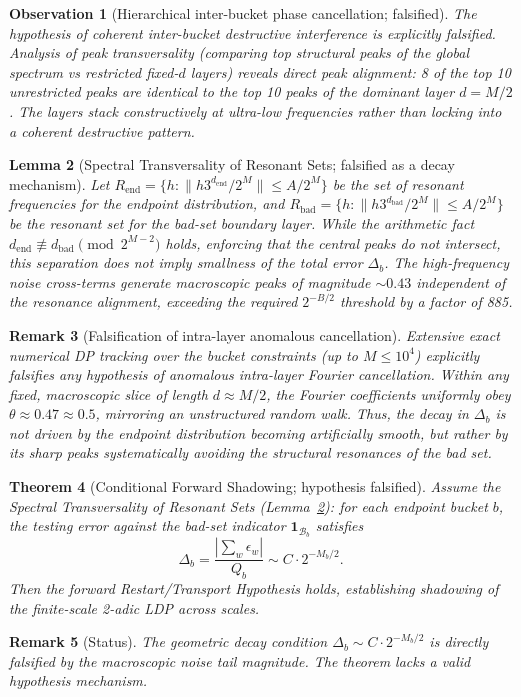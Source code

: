 \documentclass[12pt,a4paper]{article}
\newtheorem{theorem}{Theorem}[section]
\newtheorem{lemma}[theorem]{Lemma}
\newtheorem{remark}[theorem]{Remark}
\newtheorem{observation}[theorem]{Observation}
\begin{document}
\begin{observation}[Hierarchical inter-bucket phase cancellation; falsified]
\label{obs:hierarchical_inter_bucket}
The hypothesis of coherent inter-bucket destructive interference is explicitly falsified. Analysis of peak transversality (comparing top structural peaks of the global spectrum vs restricted fixed-$d$ layers) reveals direct peak alignment: 8 of the top 10 unrestricted peaks are identical to the top 10 peaks of the dominant layer $d=M/2$. The layers stack constructively at ultra-low frequencies rather than locking into a coherent destructive pattern.
\end{observation}

\begin{lemma}[Spectral Transversality of Resonant Sets; falsified as a decay mechanism]
\label{lem:spectral_transversality}
Let $R_{\text{end}} = \{h : \|h 3^{d_{\text{end}}} / 2^M\| \le A/2^M\}$ be the set of resonant frequencies for the endpoint distribution, and $R_{\text{bad}} = \{h : \|h 3^{d_{\text{bad}}} / 2^M\| \le A/2^M\}$ be the resonant set for the bad-set boundary layer. 
While the arithmetic fact $d_{\text{end}} \not\equiv d_{\text{bad}} \pmod{2^{M-2}}$ holds, enforcing that the central peaks do not intersect, this separation does not imply smallness of the total error $\Delta_b$. The high-frequency noise cross-terms generate macroscopic peaks of magnitude $\sim 0.43$ independent of the resonance alignment, exceeding the required $2^{-B/2}$ threshold by a factor of 885.
\end{lemma}

\begin{remark}[Falsification of intra-layer anomalous cancellation]
Extensive exact numerical DP tracking over the bucket constraints (up to $M \le 10^4$) explicitly falsifies any hypothesis of anomalous intra-layer Fourier cancellation. Within any fixed, macroscopic slice of length $d \approx M/2$, the Fourier coefficients uniformly obey $\theta \approx 0.47 \approx 0.5$, mirroring an unstructured random walk. Thus, the decay in $\Delta_b$ is not driven by the endpoint distribution becoming artificially smooth, but rather by its sharp peaks systematically avoiding the structural resonances of the bad set.
\end{remark}

\begin{theorem}[Conditional Forward Shadowing; hypothesis falsified]
\label{thm:conditional_shadowing}
Assume the Spectral Transversality of Resonant Sets (Lemma~\ref{lem:spectral_transversality}):
for each endpoint bucket $b$, the testing error against the bad-set indicator $\mathbf{1}_{\mathcal{B}_b}$ satisfies
\[
\Delta_b = \frac{|\sum_w \epsilon_w|}{Q_b} \sim C \cdot 2^{-M_b/2}.
\]
Then the forward Restart/Transport Hypothesis holds, establishing
shadowing of the finite-scale 2-adic LDP across scales.
\end{theorem}
\begin{remark}[Status]
The geometric decay condition $\Delta_b \sim C \cdot 2^{-M_b/2}$ is directly falsified by the macroscopic noise tail magnitude. The theorem lacks a valid hypothesis mechanism.
\end{remark}
\end{document}
